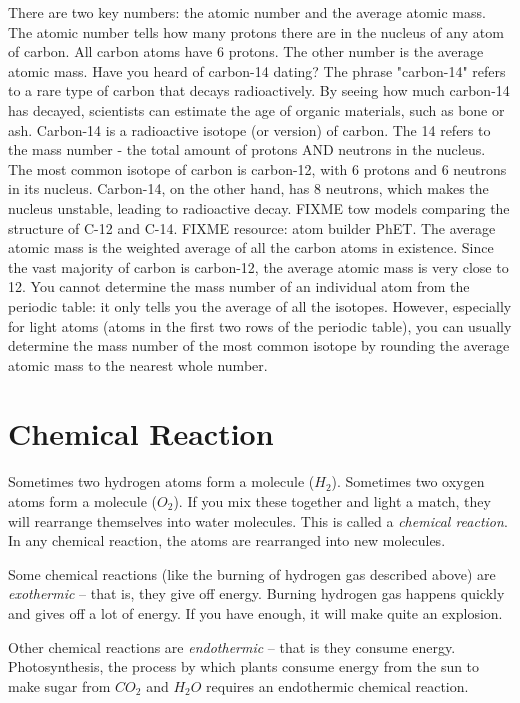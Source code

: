 There are two key numbers: the atomic number and the average atomic mass. The
atomic number tells how many protons there are in the nucleus of any atom of
carbon. All carbon atoms have 6 protons. The other number is the average atomic
mass. Have you heard of carbon-14 dating? The phrase "carbon-14" refers to a rare
type of carbon that decays radioactively. By seeing how much carbon-14 has
decayed, scientists can estimate the age of organic materials, such as bone or
ash. Carbon-14 is a radioactive isotope (or version) of carbon. The 14 refers to
the mass number - the total amount of protons AND neutrons in the nucleus. The
most common isotope of carbon is carbon-12, with 6 protons and 6 neutrons in its
nucleus. Carbon-14, on the other hand, has 8 neutrons, which makes the nucleus
unstable, leading to radioactive decay. FIXME tow models comparing the structure
of  C-12 and C-14. FIXME resource: atom builder PhET. The average atomic mass is
the weighted average of all the carbon atoms in existence. Since the vast
majority of carbon is carbon-12, the average atomic mass is very close to 12. You
cannot determine the mass number of an individual atom from the periodic table:
it only tells you the average of all the isotopes. However, especially for light
atoms (atoms in the first two rows of the periodic table), you can usually
determine the mass number of the most common isotope by rounding the average
atomic mass to the nearest whole number.

\section{Chemical Reaction}

Sometimes two hydrogen atoms form a molecule ($H_2$). Sometimes two
oxygen atoms form a molecule ($O_2$). If you mix these
together and light a match, they will rearrange themselves into water
molecules. This is called a \textit{chemical reaction}.  In any
chemical reaction, the atoms are rearranged into new molecules.

Some chemical reactions (like the burning of hydrogen gas described
above) are \textit{exothermic} -- that is, they give off energy.
Burning hydrogen gas happens quickly and gives off a lot of energy. If
you have enough, it will make quite an explosion.

Other chemical reactions are \textit{endothermic} -- that is they consume
energy.  Photosynthesis, the process by which plants consume energy
from the sun to make sugar from $CO_2$ and $H_2O$ requires an endothermic
chemical reaction.


